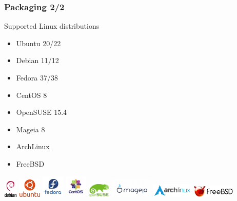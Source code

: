 \documentclass[aspectratio=169]{beamer}
\begin{document}
\begin{frame}
\frametitle{Packaging 2/2}
\begin{block}{Supported Linux distributions}
\begin{itemize}
\item Ubuntu 20/22
\item Debian 11/12
\item Fedora 37/38
\item CentOS 8
\item OpenSUSE 15.4
\item Mageia 8
\item ArchLinux
\item FreeBSD
\end{itemize}
\end{block}


\begin{center}
\includegraphics[width=0.05\textwidth]{figures/debian-openlogo-100}
\includegraphics[width=0.08\textwidth]{figures/ubuntu}
\includegraphics[width=0.08\textwidth]{figures/Fedora-Logo}
\includegraphics[width=0.08\textwidth]{figures/centos-logo}
\includegraphics[width=0.08\textwidth]{figures/opensuse-logo}
\includegraphics[width=0.15\textwidth]{figures/200px-Logo_mageia_official}
\includegraphics[width=0.15\textwidth]{figures/archlinux-logo}
\includegraphics[width=0.15\textwidth]{figures/FREEBSD_Logo_Horiz_Pos_RGB}
\end{center}

\end{frame}
\end{document}
